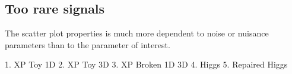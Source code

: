 \subsection{Too rare signals} %
\label{sub:too_rare_signals}



The scatter plot properties is much more dependent to noise or nuisance parameters than to the parameter of interest.







1. XP Toy 1D
2. XP Toy 3D
3. XP Broken 1D 3D
4. Higgs
5. Repaired Higgs
